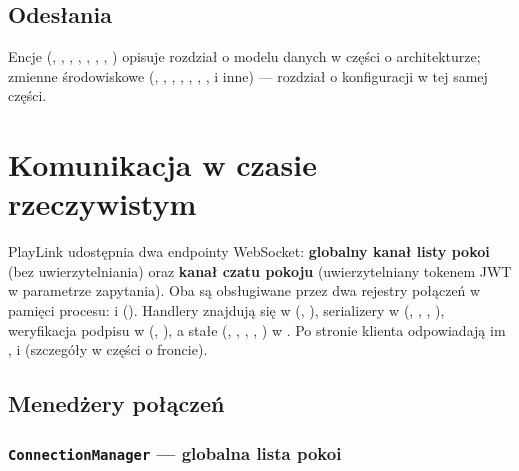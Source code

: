 \section{Odesłania}

Encje (, , , , ,
, , ) opisuje rozdział o modelu danych w części o architekturze;
zmienne środowiskowe (, , ,
, , ,
,  i inne) --- rozdział o konfiguracji
w tej samej części.


\chapter{Komunikacja w czasie rzeczywistym}
\label{ch:realtime}

PlayLink udostępnia dwa endpointy WebSocket: \textbf{globalny kanał listy pokoi} (bez uwierzytelniania)
oraz \textbf{kanał czatu pokoju} (uwierzytelniany tokenem JWT w parametrze zapytania). Oba są
obsługiwane przez dwa rejestry połączeń w pamięci procesu:  i
 (). Handlery znajdują się w
 (, ), serializery w
 (, ,
, ), weryfikacja podpisu w 
(, ), a stałe (,
, , , ) w
. Po stronie klienta odpowiadają im , 
i  (szczegóły w części o froncie).

\section{Menedżery połączeń}
\label{sec:rt-managery}

\subsection{\texttt{ConnectionManager} --- globalna lista pokoi}

